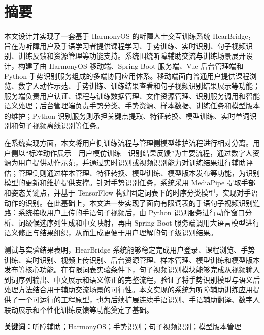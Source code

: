 ﻿%
\chapter*{摘\quad 要}

本文设计并实现了一套基于 HarmonyOS 的听障人士交互训练系统 HearBridge，旨在为听障用户及手语学习者提供课程学习、手势训练、实时识别、句子视频识别、训练反馈和资源管理等功能支持。系统围绕听障辅助交流与训练场景展开设计，构建了由 HarmonyOS 移动端、Spring Boot 服务端、Vue 后台管理端和 Python 手势识别服务组成的多端协同应用体系。移动端面向普通用户提供课程浏览、数字人动作示范、手势训练、训练结果查看和句子视频识别结果展示等功能；服务端负责用户认证、课程与训练数据管理、文件资源管理、识别服务调用和智能语义处理；后台管理端负责手势分类、手势资源、样本数据、训练任务和模型版本的维护；Python 识别服务则承担关键点提取、特征转换、模型训练、实时单词识别和句子视频离线识别等任务。

在系统实现方面，本文将用户侧训练流程与管理侧模型维护流程进行相对分离。用户侧以“标准动作展示—用户模仿训练—识别结果反馈”为主要流程，通过数字人资源为用户提供动作示范，并通过实时识别或视频识别能力对训练结果进行辅助评估；管理侧则通过样本管理、特征转换、模型训练、模型版本发布等功能，为识别模型的更新和维护提供支撑。针对手势识别任务，系统采用 MediaPipe 提取手部和姿态关键点，并基于 TensorFlow 构建固定词表下的时序分类模型，实现对手语动作的识别。在此基础上，本文进一步实现了面向有限词表的手语句子视频识别链路：系统接收用户上传的手语句子视频后，由 Python 识别服务进行动作窗口分析、词级候选序列生成和中文映射，再由 Spring Boot 服务端调用大语言模型进行语义修正与结果组织，从而生成更便于用户理解的句子级识别结果。

测试与实验结果表明，HearBridge 系统能够稳定完成用户登录、课程浏览、手势训练、实时识别、视频上传识别、后台资源管理、样本管理、模型训练和模型版本发布等核心功能。在有限词表实验条件下，句子视频识别模块能够完成从视频输入到词序列输出、中文展示和语义修正的完整流程，验证了将手势识别模型与语义后处理方法结合用于辅助交流场景的可行性。本文实现的系统为听障辅助训练应用提供了一个可运行的工程原型，也为后续扩展连续手语识别、手语辅助翻译、数字人联动展示和个性化训练反馈等功能奠定了基础。

\vspace{1em}

\noindent\textbf{关键词：}听障辅助；HarmonyOS；手势识别；句子视频识别；模型版本管理

